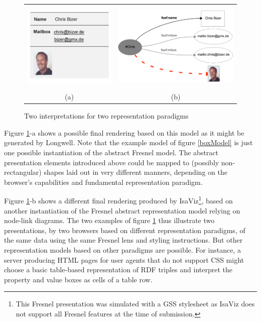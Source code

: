 \begin{figure}
    \begin{tabular}{c|c}
      \includegraphics[height=4.3cm]{boxmodelexampleoutput.pdf} &
      \includegraphics[height=4.3cm]{isv_scs.pdf} \\
      (a) & (b)\\
    \end{tabular}
    \caption{Two interpretations for two representation paradigms}
    \label{boxEx}
\end{figure}

Figure \ref{boxEx}-a shows a possible final rendering based on this model as it might be generated by Longwell. Note that the example model of figure \ref{boxModel} is just one possible instantiation of the abstract Fresnel model. The abstract presentation elements introduced above could be mapped to (possibly non-rectangular) shapes laid out in very different manners, depending on the browser's capabilities and fundamental representation paradigm.

Figure \ref{boxEx}-b shows a different final rendering produced by IsaViz\footnote{This Fresnel presentation was simulated with a GSS stylesheet \cite{Pietriga03} as IsaViz does not support all Fresnel features at the time of submission.}, based on another instantiation of the Fresnel abstract representation model relying on node-link diagrams. The two examples of figure \ref{boxEx} thus illustrate two presentations, by two browsers based on different representation paradigms, of the same data using the same Fresnel lens and styling instructions. But other representation models based on  other paradigms are possible. For instance, a server producing HTML pages for user agents that do not support CSS might choose a basic table-based representation of RDF triples and interpret the property and value boxes as cells of a table row.



